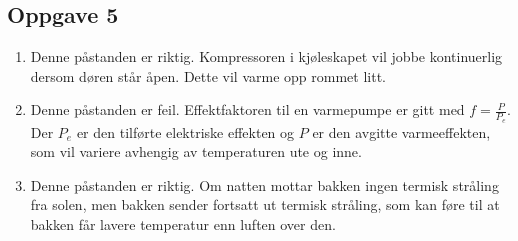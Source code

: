 \documentclass{report}%
\newcommand{\opg}[1]{\subsection*{Oppgave #1}}
\newcommand{\opgd}[1]{\item}
\begin{document}
\newpage
\opg{5}
\begin{enumerate}[leftmargin=*,itemsep=1cm,labelsep=2em,label=\alph*)]
\opgd{a} Denne påstanden er riktig. Kompressoren i kjøleskapet vil jobbe kontinuerlig dersom døren står åpen. Dette vil varme opp rommet litt.
\opgd{b} Denne påstanden er feil. Effektfaktoren til en varmepumpe er gitt med $f = \frac{P}{P_e}$. Der $P_e$ er den tilførte elektriske effekten og $P$ er den avgitte varmeeffekten, som vil variere avhengig av temperaturen ute og inne.
\opgd{c} Denne påstanden er riktig. Om natten mottar bakken ingen termisk stråling fra solen, men bakken sender fortsatt ut termisk stråling, som kan føre til at bakken får lavere temperatur enn luften over den.

\end{enumerate}
\end{document}
